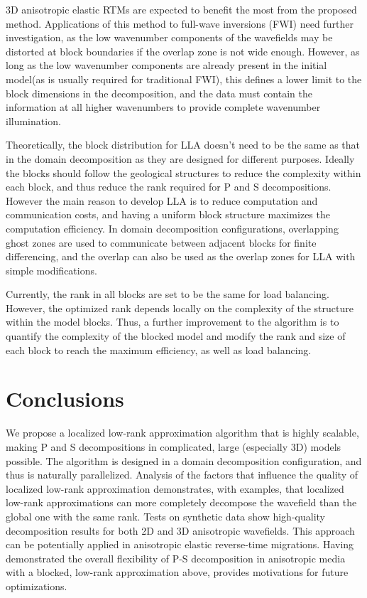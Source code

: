 \documentclass[manuscript,ulem,graphix,revised]{geophysics}
\begin{document}
3D anisotropic elastic RTMs are expected to benefit the most from the proposed method. Applications of this method to full-wave inversions (FWI) need further investigation, as the low wavenumber components of the wavefields may be distorted at block boundaries if the overlap zone is not wide enough. However, as long as the low wavenumber components are already present in the initial model(as is usually required for traditional FWI), this defines a lower limit to the block dimensions in the decomposition, and the data must contain the information at all higher wavenumbers to provide complete wavenumber illumination.

Theoretically, the block distribution for LLA doesn't need to be the same as that in the domain decomposition as they are designed for different purposes. Ideally the blocks should follow the geological structures to reduce the complexity within each block, and thus reduce the rank required for P and S decompositions. However the main reason to develop LLA is to reduce computation and communication costs, and having a uniform block structure maximizes the computation efficiency. In domain decomposition configurations, overlapping ghost zones are used to communicate between adjacent blocks for finite differencing, and the overlap can also be used as the overlap zones for LLA with simple modifications. 

Currently, the rank in all blocks are set to be the same for load balancing. However, the optimized rank depends locally on the complexity of the structure within the model blocks. Thus, a further improvement to the algorithm is to quantify the complexity of the blocked model and modify the rank and size of each block to reach the maximum efficiency, as well as load balancing.


\section{Conclusions}
\indent\indent
We propose a localized low-rank approximation algorithm that is highly scalable, making P and S decompositions in complicated, large (especially 3D) models possible.
The algorithm is designed in a domain decomposition configuration, and thus is naturally parallelized. Analysis of the factors that influence the quality of localized low-rank approximation demonstrates, with examples, that localized low-rank approximations can more completely decompose the wavefield than the global one with the same rank. 
Tests on synthetic data show high-quality decomposition results for both 2D and 3D anisotropic wavefields.
This approach can be potentially applied in anisotropic elastic reverse-time migrations. Having demonstrated the overall flexibility of P-S decomposition in anisotropic media with a blocked, low-rank approximation above, provides motivations for future optimizations.
\end{document}
